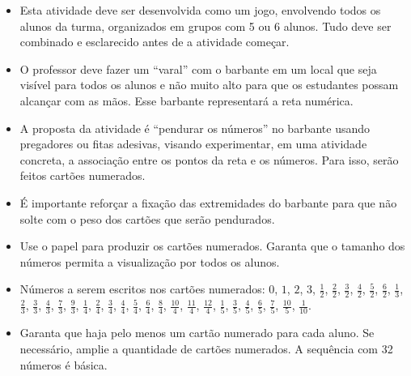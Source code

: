 \documentclass[10 pt,usenames,dvipsnames, oneside]{article}
\begin{document}
\begin{goals}
\begin{itemize} %
  \item     Esta atividade deve ser desenvolvida como um jogo, envolvendo todos os alunos da turma, organizados em grupos com 5 ou 6 alunos. Tudo deve ser combinado e esclarecido antes de a atividade começar.
  \item  O professor deve fazer um  ``varal'' com o barbante em um local que seja visível para todos os alunos e não muito alto para que os estudantes possam alcançar com as mãos. Esse barbante representará a reta numérica.
  \item A proposta da atividade é ``pendurar os números'' no barbante usando pregadores ou fitas adesivas, visando experimentar, em uma atividade concreta, a associação entre os pontos da reta e os números. Para isso, serão feitos cartões numerados.
  \item É importante reforçar a fixação das extremidades do barbante para que não solte com o peso dos cartões que serão pendurados.
  \item Use o papel para produzir os cartões numerados. Garanta que o tamanho dos números permita a visualização por todos os alunos. 
  \item  Números a serem escritos nos cartões numerados: $0$, $1$, $2$, $3$, $\frac{1}{2}$, $\frac{2}{2}$, $\frac{3}{2}$, $\frac{4}{2}$, $\frac{5}{2}$, $\frac{6}{2}$, $\frac{1}{3}$, $\frac{2}{3}$, $\frac{3}{3}$, $\frac{4}{3}$, $\frac{7}{3}$, $\frac{9}{3}$, $\frac{1}{4}$, $\frac{2}{4}$, $\frac{3}{4}$, $\frac{4}{4}$, $\frac{5}{4}$, $\frac{6}{4}$, $\frac{8}{4}$, $\frac{10}{4}$, $\frac{11}{4}$, $\frac{12}{4}$, $\frac{1}{5}$, $\frac{3}{5}$, $\frac{4}{5}$, $\frac{6}{5}$, $\frac{7}{5}$, $\frac{10}{5}$, $\frac{1}{10}$.
  \item Garanta que haja pelo menos um cartão numerado para cada aluno. Se necessário, amplie a quantidade de cartões numerados. A sequência com 32 números é básica. 
\end{itemize} %


\end{goals}
\end{document}
